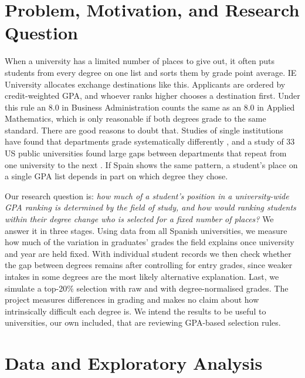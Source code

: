 \documentclass[clean]{bam-proposal}
\begin{document}
\makeproposalheader

\section{Problem, Motivation, and Research Question}

When a university has a limited number of places to give out, it often puts students from every degree on one list and sorts them by grade point average. IE University allocates exchange destinations like this. Applicants are ordered by credit-weighted GPA, and whoever ranks higher chooses a destination first. Under this rule an 8.0 in Business Administration counts the same as an 8.0 in Applied Mathematics, which is only reasonable if both degrees grade to the same standard. There are good reasons to doubt that. Studies of single institutions have found that departments grade systematically differently \cite{sabot1991grade,achen2009grades}, and a study of 33 US public universities found large gaps between departments that repeat from one university to the next \cite{jeong2024grades}. If Spain shows the same pattern, a student's place on a single GPA list depends in part on which degree they chose.

Our research question is: \emph{how much of a student's position in a university-wide GPA ranking is determined by the field of study, and how would ranking students within their degree change who is selected for a fixed number of places?} We answer it in three stages. Using data from all Spanish universities, we measure how much of the variation in graduates' grades the field explains once university and year are held fixed. With individual student records we then check whether the gap between degrees remains after controlling for entry grades, since weaker intakes in some degrees are the most likely alternative explanation. Last, we simulate a top-20\% selection with raw and with degree-normalised grades. The project measures differences in grading and makes no claim about how intrinsically difficult each degree is. We intend the results to be useful to universities, our own included, that are reviewing GPA-based selection rules.

\section{Data and Exploratory Analysis}
\end{document}
